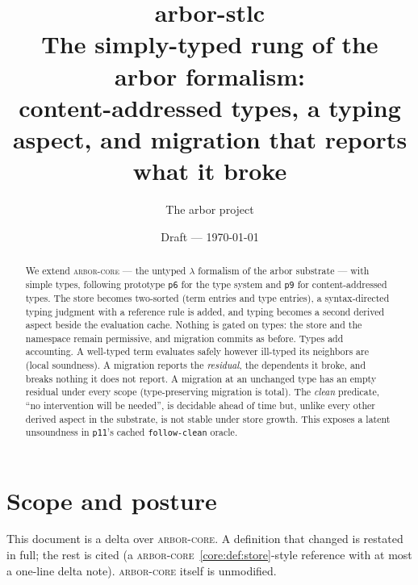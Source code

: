 \documentclass[11pt]{article}
\title{\textbf{arbor-stlc}\\[2pt]
\large The simply-typed rung of the arbor formalism:\\
content-addressed types, a typing aspect, and migration that reports what it broke}
\author{The arbor project}
\date{Draft --- \today}
\theoremstyle{definition}
\theoremstyle{plain}
\theoremstyle{remark}
\newcommand{\arborcore}{\textsc{arbor-core}}
\newcommand{\coreref}[1]{\arborcore~\cref{core:#1}}
\begin{document}
\maketitle

\begin{abstract}
We extend \arborcore{} --- the untyped $\lambda$ formalism of the arbor substrate --- with
simple types, following prototype \texttt{p6} for the type system and \texttt{p9} for
content-addressed types. The store becomes two-sorted (term entries and type entries), a
syntax-directed typing judgment with a reference rule is added, and typing becomes a second
derived aspect beside the evaluation cache. Nothing is gated on types: the store and the
namespace remain permissive, and migration commits as before. Types add accounting. A
well-typed term evaluates safely however ill-typed its neighbors are (local soundness). A
migration reports the \emph{residual}, the dependents it broke, and breaks nothing it does not
report. A migration at an unchanged type has an empty residual under every scope
(type-preserving migration is total). The \emph{clean} predicate, ``no intervention will be
needed'', is decidable ahead of time but, unlike every other derived aspect in the substrate,
is not stable under store growth. This exposes a latent unsoundness in \texttt{p11}'s cached
\texttt{follow-clean} oracle.
\end{abstract}

\tableofcontents

\section{Scope and posture}\label{sec:scope}

This document is a delta over \arborcore{}. A definition that changed is restated in full;
the rest is cited (a \coreref{def:store}-style reference with at most a one-line delta note).
\arborcore{} itself is unmodified.
\end{document}
